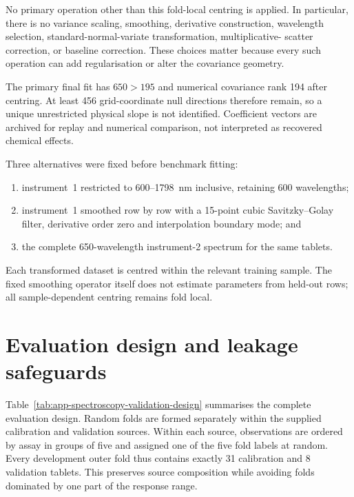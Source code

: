 No primary operation other than this fold-local centring is applied.  In
particular, there is no variance scaling, smoothing, derivative construction,
wavelength selection, standard-normal-variate transformation, multiplicative-
scatter correction, or baseline correction.  These choices matter because
every such operation can add regularisation or alter the covariance geometry.

The primary final fit has $650>195$ and numerical covariance rank 194 after
centring.  At least 456 grid-coordinate null directions therefore remain, so a
unique unrestricted physical slope is not identified.  Coefficient vectors
are archived for replay and numerical comparison, not interpreted as recovered
chemical effects.

Three alternatives were fixed before benchmark fitting:
\begin{enumerate}
    \item instrument~1 restricted to 600--1798~nm inclusive, retaining 600
    wavelengths;
    \item instrument~1 smoothed row by row with a 15-point cubic
    Savitzky--Golay filter, derivative order zero and interpolation boundary
    mode; and
    \item the complete 650-wavelength instrument-2 spectrum for the same
    tablets.
\end{enumerate}
Each transformed dataset is centred within the relevant training sample.  The
fixed smoothing operator itself does not estimate parameters from held-out
rows; all sample-dependent centring remains fold local.

\section{Evaluation design and leakage safeguards}
\label{sec:app-spectroscopy-validation}

Table~\ref{tab:app-spectroscopy-validation-design} summarises the complete
evaluation design.  Random folds are formed separately within the supplied
calibration and validation sources.  Within each source, observations are
ordered by assay in groups of five and assigned one of the five fold labels at
random.  Every development outer fold thus contains exactly 31 calibration
and 8 validation tablets.  This preserves source composition while avoiding
folds dominated by one part of the response range.

